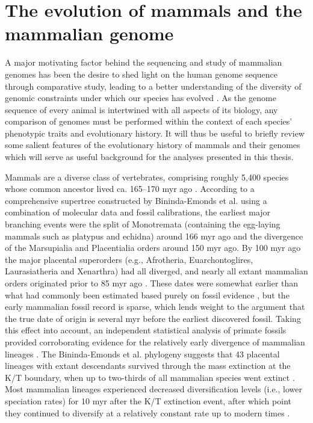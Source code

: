 \section{The evolution of mammals and the mammalian genome}
\label{section_mammal_evolution}

A major motivating factor behind the sequencing and study of mammalian
genomes has been the desire to shed light on the human genome sequence
through comparative study, leading to a better understanding of the
diversity of genomic constraints under which our species has evolved
\citep{Mouse2002Initial}. As the genome sequence of every animal is
intertwined with all aspects of its biology, any comparison of genomes
must be performed within the context of each species' phenotypic
traits and evolutionary history. It will thus be useful to briefly
review some salient features of the evolutionary history of mammals
and their genomes which will serve as useful background for the
analyses presented in this thesis.

Mammals are a diverse class of vertebrates, comprising roughly 5,400
species whose common ancestor lived ca. 165--170 \ac{myr} ago
\citep{Wilson2005}. According to a comprehensive supertree constructed
by Bininda-Emonds et al. using a combination of molecular data and
fossil calibrations, the earliest major branching events were the
split of Monotremata (containing the egg-laying mammals such as
platypus and echidna) around 166 \ac{myr} ago and the divergence of
the Marsupialia and Placentialia orders around 150 \ac{myr} ago. By
100 \ac{myr} ago the major placental superorders (e.g., Afrotheria,
Euarchontoglires, Laurasiatheria and Xenarthra) had all diverged, and
nearly all extant mammalian orders originated prior to 85 \ac{myr} ago
\citep{BinindaEmonds2007}. These dates were somewhat earlier than what
had commonly been estimated based purely on fossil evidence
\citep{Archibald2001}, but the early mammalian fossil record is
sparse, which lends weight to the argument that the true date of
origin is several \ac{myr} before the earliest discovered
fossil. Taking this effect into account, an independent statistical
analysis of primate fossils provided corroborating evidence for the
relatively early divergence of mammalian lineages
\citep{Martin2007}. The Bininda-Emonds et al. phylogeny suggests that
43 placental lineages with extant descendants survived through the
mass extinction at the K/T boundary, when up to two-thirds of all
mammalian species went extinct \citep{Alroy1999}. Most mammalian
lineages experienced decreased diversification levels (i.e., lower
speciation rates) for 10 \ac{myr} after the K/T extinction event,
after which point they continued to diversify at a relatively constant
rate up to modern times \citep{BinindaEmonds2007,Martin2007}.

